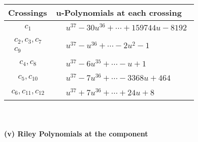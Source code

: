 \documentclass[1p]{elsarticle_modified}
\theoremstyle{definition}
\begin{document}
\begin{tabular}{m{50pt}|m{274pt}}
Crossings & \hspace{64pt}u-Polynomials at each crossing \\
\hline $$\begin{aligned}c_{1}\end{aligned}$$&$\begin{aligned}
&u^{37}-30 u^{36}+\cdots+159744 u-8192
\end{aligned}$\\
\hline $$\begin{aligned}c_{2},c_{3},c_{7}\\c_{9}\end{aligned}$$&$\begin{aligned}
&u^{37}- u^{36}+\cdots-2 u^2-1
\end{aligned}$\\
\hline $$\begin{aligned}c_{4},c_{8}\end{aligned}$$&$\begin{aligned}
&u^{37}-6 u^{35}+\cdots- u+1
\end{aligned}$\\
\hline $$\begin{aligned}c_{5},c_{10}\end{aligned}$$&$\begin{aligned}
&u^{37}-7 u^{36}+\cdots-3368 u+464
\end{aligned}$\\
\hline $$\begin{aligned}c_{6},c_{11},c_{12}\end{aligned}$$&$\begin{aligned}
&u^{37}+7 u^{36}+\cdots+24 u+8
\end{aligned}$\\
\hline
\end{tabular}\\~\\
\newpage\renewcommand{\arraystretch}{1}
\flushleft \textbf{(v) Riley Polynomials at the component}\newline \\
\end{document}
